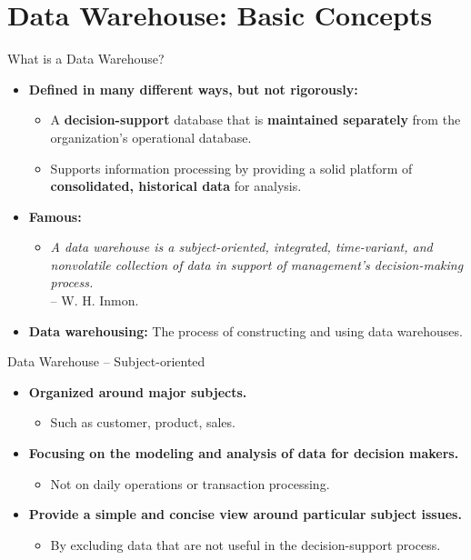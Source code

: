\section{Data Warehouse: Basic Concepts}

\begin{frame}{What is a Data Warehouse?}
  \begin{itemize}
  \item \textbf{Defined in many different ways, but not rigorously:}
    \begin{itemize}
    \item A \textbf{\color{airforceblue}decision-support} database that is \textbf{\color{airforceblue}maintained separately} from the organization's operational database.
    \item Supports information processing by providing a solid platform of \textbf{\color{airforceblue}consolidated, historical data} for analysis.
    \end{itemize}
  \item \textbf{Famous:} \\
    \begin{itemize}
    \item \emph{A data warehouse is a {\color{airforceblue}subject-oriented, integrated, time-variant, and nonvolatile} collection of data in support of management's decision-making process.}\\-- W. H. Inmon.
    \end{itemize}
  \item \textbf{\color{airforceblue}Data warehousing:} The process of constructing and using data warehouses.
  \end{itemize}
\end{frame}

\begin{frame}{Data Warehouse -- Subject-oriented}
  \begin{itemize}
  \item \textbf{Organized around major subjects.}
    \begin{itemize}
    \item Such as customer, product, sales.
    \end{itemize}
  \item \textbf{Focusing on the modeling and analysis of data for {\color{airforceblue}decision makers}.}
    \begin{itemize}
    \item Not on daily operations or transaction processing.
    \end{itemize}
  \item \textbf{Provide a simple and concise view around particular subject issues.}
    \begin{itemize}
    \item By excluding data that are not useful in the decision-support process.
    \end{itemize}
  \end{itemize}
\end{frame}

